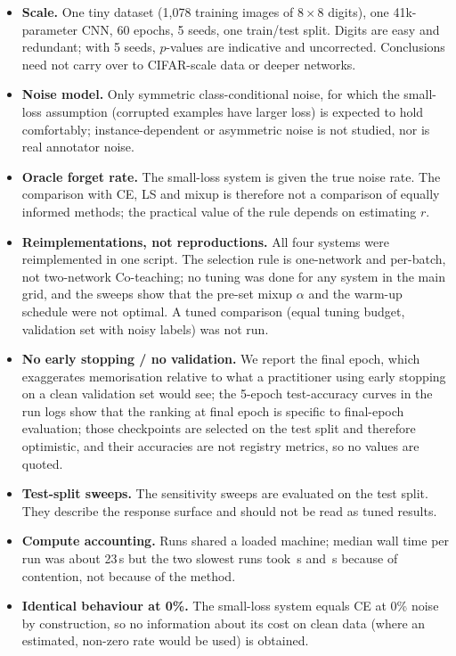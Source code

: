 \begin{itemize}
\item \textbf{Scale.} One tiny dataset (1,078 training images of $8{\times}8$ digits), one 41k-parameter CNN, 60 epochs, 5 seeds, one train/test split. Digits are easy and redundant; with 5 seeds, $p$-values are indicative and uncorrected. Conclusions need not carry over to CIFAR-scale data or deeper networks.
\item \textbf{Noise model.} Only symmetric class-conditional noise, for which the small-loss assumption (corrupted examples have larger loss) is expected to hold comfortably; instance-dependent or asymmetric noise is not studied, nor is real annotator noise.
\item \textbf{Oracle forget rate.} The small-loss system is given the true noise rate. The comparison with CE, LS and mixup is therefore not a comparison of equally informed methods; the practical value of the rule depends on estimating $r$.
\item \textbf{Reimplementations, not reproductions.} All four systems were reimplemented in one script. The selection rule is one-network and per-batch, not two-network Co-teaching; no tuning was done for any system in the main grid, and the sweeps show that the pre-set mixup $\alpha$ and the warm-up schedule were not optimal. A tuned comparison (equal tuning budget, validation set with noisy labels) was not run.
\item \textbf{No early stopping / no validation.} We report the final epoch, which exaggerates memorisation relative to what a practitioner using early stopping on a clean validation set would see; the 5-epoch test-accuracy curves in the run logs show that the ranking at final epoch is specific to final-epoch evaluation; those checkpoints are selected on the test split and therefore optimistic, and their accuracies are not registry metrics, so no values are quoted.
\item \textbf{Test-split sweeps.} The sensitivity sweeps are evaluated on the test split. They describe the response surface and should not be read as tuned results.
\item \textbf{Compute accounting.} Runs shared a loaded machine; median wall time per run was about 23\,s but the two slowest runs took \,s and \,s because of contention, not because of the method.
\item \textbf{Identical behaviour at 0\%.} The small-loss system equals CE at 0\% noise by construction, so no information about its cost on clean data (where an estimated, non-zero rate would be used) is obtained.
\end{itemize}
